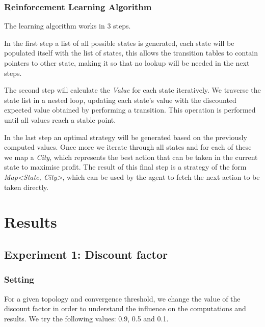 \documentclass[11pt]{article}
\begin{document}
\subsubsection{Reinforcement Learning Algorithm}

The learning algorithm works in 3 steps.

In the first step a list of all possible states is generated, each state will be populated itself with the list of states, this allows the transition tables to contain pointers to other state, making it so that no lookup will be needed in the next steps.

The second step will calculate the \textit{Value} for each state iteratively. We traverse the state list in a nested loop, updating each state's value with the discounted expected value obtained by performing a transition. This operation is performed until all values reach a stable point.

In the last step an optimal strategy will be generated based on the previously computed values. Once more we iterate through all states and for each of these we map a \textit{City}, which represents the best action that can be taken in the current state to maximise profit.
The result of this final step is a strategy of the form \textit{Map<State, City>}, which can be used by the agent to fetch the next action to be taken directly.


\section{Results}

\subsection{Experiment 1: Discount factor}

\subsubsection{Setting}
For a given topology and convergence threshold, we change the value of the discount factor in order to understand the influence on the computations and results. We try the following values: 0.9, 0.5 and 0.1.
\end{document}
